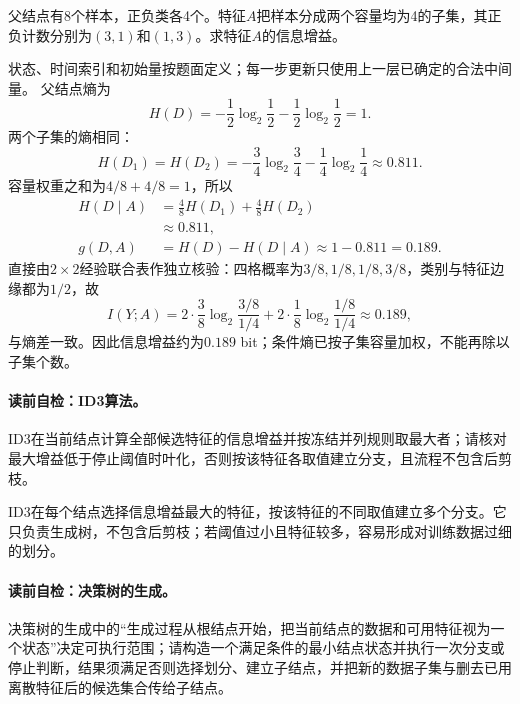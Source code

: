\label{struct:V2-C04-CH18}
\begin{example}[八样本二叉划分的信息增益]\label{exm:V2-C04-information-gain}
父结点有8个样本，正负类各4个。特征$A$把样本分成两个容量均为4的子集，其正负计数分别为$(3,1)$和$(1,3)$。求特征$A$的信息增益。
\end{example}
\begin{solution}
\SolGiven 状态、时间索引和初始量按题面定义；每一步更新只使用上一层已确定的合法中间量。
\SolDerive
父结点熵为
\[
H(D)=-\frac12\log_2\frac12-\frac12\log_2\frac12=1.
\]
两个子集的熵相同：
\[
H(D_1)=H(D_2)
=-\frac34\log_2\frac34-\frac14\log_2\frac14
\approx0.811.
\]
容量权重之和为$4/8+4/8=1$，所以
\[
\begin{aligned}
H(D\mid A)
&=\frac48H(D_1)+\frac48H(D_2)\\
&\approx0.811,\\
g(D,A)&=H(D)-H(D\mid A)\approx1-0.811=0.189.
\end{aligned}
\]
直接由$2\times2$经验联合表作独立核验：四格概率为$3/8,1/8,1/8,3/8$，类别与特征边缘都为$1/2$，故
\[
I(Y;A)=2\cdot\frac38\log_2\frac{3/8}{1/4}
+2\cdot\frac18\log_2\frac{1/8}{1/4}
\approx0.189,
\]
与熵差一致。因此信息增益约为$0.189$ bit；条件熵已按子集容量加权，不能再除以子集个数。
\end{solution}


\paragraph{读前自检：ID3算法。}ID3在当前结点计算全部候选特征的信息增益并按冻结并列规则取最大者；请核对最大增益低于停止阈值时叶化，否则按该特征各取值建立分支，且流程不包含后剪枝。\par

ID3在每个结点选择信息增益最大的特征，按该特征的不同取值建立多个分支。它只负责生成树，不包含后剪枝；若阈值过小且特征较多，容易形成对训练数据过细的划分。

\paragraph{读前自检：决策树的生成。}决策树的生成中的“生成过程从根结点开始，把当前结点的数据和可用特征视为一个状态”决定可执行范围；请构造一个满足条件的最小结点状态并执行一次分支或停止判断，结果须满足否则选择划分、建立子结点，并把新的数据子集与删去已用离散特征后的候选集合传给子结点。\par

